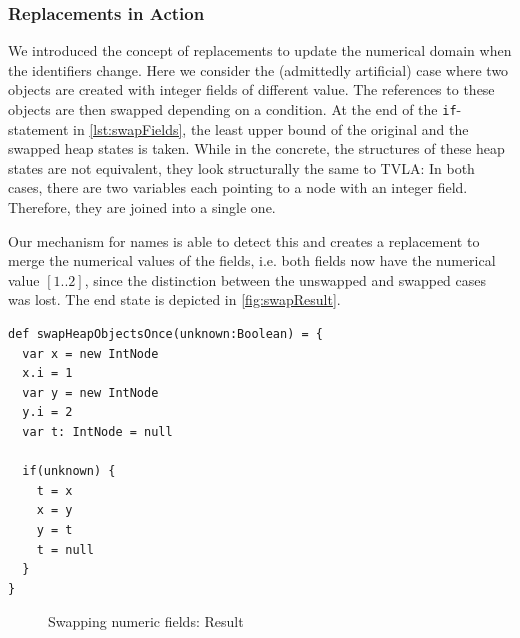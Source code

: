 \documentclass[11pt,a4paper,english]{article}
\begin{document}
\subsubsection{Replacements in Action}
We introduced the concept of replacements to update the numerical domain when
the identifiers change. Here we consider the (admittedly artificial) case where
two objects are created with integer fields of different value. The references
to these objects are then swapped depending on a condition. At the end of the
\texttt{if}-statement in \autoref{lst:swapFields}, the least upper bound of the
original and the swapped heap states is taken. While in the concrete, the
structures of these heap states are not equivalent, they look structurally the
same to TVLA: In both cases, there are two variables each pointing to a node
with an integer field. Therefore, they are joined into a single one.

Our mechanism for names is able to detect this and creates a replacement to
merge the numerical values of the fields, i.e. both fields now have the numerical
value $[1..2]$, since the distinction between the unswapped and swapped cases
was lost. The end state is depicted in \autoref{fig:swapResult}.

\begin{lstlisting}[float,caption={Swap fields testcase},label={lst:swapFields}]
def swapHeapObjectsOnce(unknown:Boolean) = {
  var x = new IntNode
  x.i = 1
  var y = new IntNode
  y.i = 2
  var t: IntNode = null
  
  if(unknown) {
    t = x
    x = y
    y = t
    t = null
  }  
}
\end{lstlisting}

\begin{figure} 
  \centering
  \hspace{1cm}
  \caption{Swapping numeric fields: Result}
  \label{fig:swapResult}
\end{figure}
\end{document}
